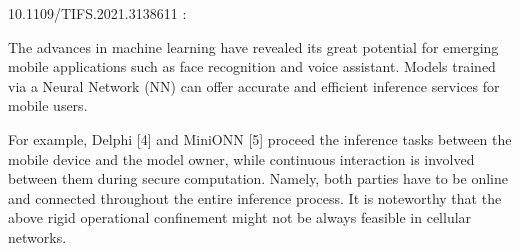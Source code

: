 \documentclass[../thesis.tex]{subfiles}
\begin{document}
 10.1109/TIFS.2021.3138611 :
 
The advances in machine learning have revealed its
great potential for emerging mobile applications such as face
recognition and voice assistant. Models trained via a Neural
Network (NN) can offer accurate and efficient inference services for mobile users. 

For example, Delphi [4] and MiniONN [5] proceed the inference
tasks between the mobile device and the model owner, while
continuous interaction is involved between them during secure
computation. Namely, both parties have to be online and
connected throughout the entire inference process. It is noteworthy that the above rigid operational confinement might not
be always feasible in cellular networks. 
\end{document}
